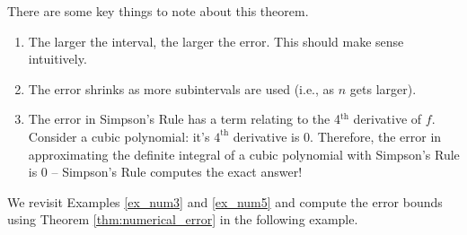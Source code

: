 There are some key things to note about this theorem.
\begin{enumerate}
	\item		The larger the interval, the larger the error. This should make sense intuitively.
	\item		The error shrinks as more subintervals are used (i.e., as $n$ gets larger).  
	\item		The error in Simpson's Rule has a term relating to the 4$^{\text{th}}$ derivative of $f$. Consider a cubic polynomial: it's $4^{\text{th}}$ derivative is 0. Therefore, the error in approximating the definite integral of a cubic polynomial with Simpson's Rule is 0 -- Simpson's Rule computes the exact answer!
	\end{enumerate}

We revisit Examples \ref{ex_num3} and \ref{ex_num5} and compute the error bounds using Theorem \ref{thm:numerical_error} in the following example.\\

